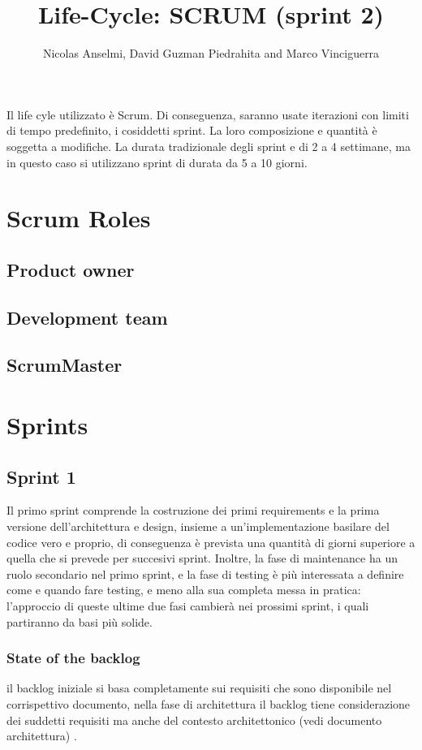 \documentclass{article}
\title{Life-Cycle: SCRUM  (sprint 2)}
\author{Nicolas Anselmi, David Guzman Piedrahita and Marco Vinciguerra}
\begin{document}
\maketitle

Il life cyle utilizzato è Scrum. Di conseguenza, saranno usate iterazioni con limiti di tempo predefinito, i cosiddetti sprint. La loro composizione e quantità è soggetta a modifiche.
La durata tradizionale degli sprint e di 2 a 4 settimane, ma in questo caso si utilizzano sprint di durata da 5 a 10 giorni.


\section{Scrum Roles}
\subsection{Product owner}
\subsection{Development team}
\subsection{ScrumMaster}

\section{Sprints} 
\subsection{Sprint 1}
Il primo sprint comprende la costruzione dei primi requirements e la prima versione dell’architettura e design, insieme a un’implementazione basilare del codice vero e proprio, di conseguenza è prevista una quantità di giorni superiore a quella che si prevede per succesivi sprint. Inoltre, la fase di maintenance ha un ruolo secondario nel primo sprint, e la fase di testing è più interessata a definire come e quando fare testing, e meno alla sua completa messa in pratica: l’approccio di queste ultime due fasi cambierà nei prossimi sprint, i quali partiranno da basi più solide. 
\subsubsection{State of the backlog}
il backlog iniziale si basa completamente sui requisiti che sono disponibile nel corrispettivo documento, nella fase di architettura il backlog tiene considerazione dei suddetti requisiti ma anche del contesto architettonico (vedi documento architettura) . 
\end{document}
